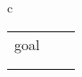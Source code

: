 \begin{figure}[h]
{\begin{tabular}{c}
\begin{tabular}{lll}
goal & \nitemt{0}{n+1}{\bml\codeblue{$\alpha$},\_} \\ [0.2in] %

{\push} & \inferrule{\nitemt{i}{j}{\bml\codeblue{$\alpha$},s}}
                              {\nitemt{j}{j\!+\!1}{\bml,0}} & \\ [0.2in]%

{\nskip} & \inferrule{\nitemt{i}{j}{\bml\codeblue{$\alpha$},s}}
                               {\nitemt{i}{j\!+\!1}{\bml\codeblue{$\alpha\md$},s+\delta}} \\ [0.2in]%


\end{tabular}
\end{tabular}}
\end{figure}
